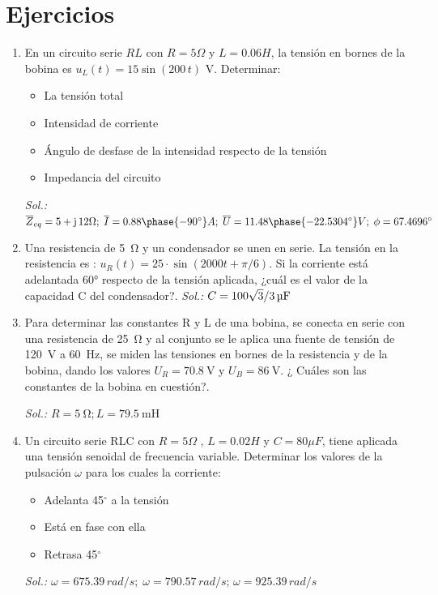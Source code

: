 \section*{Ejercicios}
	
\begin{enumerate}
		
\item En un circuito serie $RL$ con $R=5\Omega$ y $L=0.06H$, la
  tensión en bornes de la bobina es $u_L(t)=15\sin(200\,t)$
  V. Determinar:
  \begin{itemize}
  \item La tensión total
  \item Intensidad de corriente
  \item Ángulo de desfase de la intensidad respecto de la tensión
  \item Impedancia del circuito
  \end{itemize}
  \emph{Sol.:
    $\overline{Z}_{eq}=5+\mathrm{j}\,12\Omega;\;\overline{I}=0.88\phase{-90^\circ}A;\;\overline{U}=11.48\phase{-22.5304^\circ}
    V;\; \phi=67.4696^\circ$}

\item Una resistencia de \qty{5}{\ohm} y un condensador se unen en
  serie. La tensión en la resistencia es :
  $u_R(t) = 25 \cdot \sin(2000t + \pi/6)$. Si la corriente está
  adelantada \ang{60} respecto de la tensión aplicada, ¿cuál es el
  valor de la capacidad C del condensador?.  \emph{Sol.:
    $C = \SI[parse-numbers = false]{100\sqrt{3}/3}{\micro\farad}$}
  

\item Para determinar las constantes R y L de una bobina, se conecta
  en serie con una resistencia de \qty{25}{\ohm} y al conjunto se le
  aplica una fuente de tensión de \qty{120}{\volt} a \qty{60}{\hertz},
  se miden las tensiones en bornes de la resistencia y de la bobina,
  dando los valores $U_R = \qty{70.8}{\volt}$ y
  $U_B = \qty{86}{\volt}$. ¿ Cuáles son las constantes de la bobina en
  cuestión?.

  \emph{Sol.: $R = \qty{5}{\ohm}; L = \qty{79.5}{\milli\henry}$}

\item Un circuito serie RLC con $R = {5}{\Omega}$ , $L = {0.02}{H}$ y
  $C={80}{\mu F}$, tiene aplicada una tensión senoidal de frecuencia
  variable. Determinar los valores de la pulsación $\omega$ para los
  cuales la corriente:
  \begin{itemize}
  \item Adelanta {45}{$^\circ$} a la tensión
  \item Está en fase con ella
  \item Retrasa {45}{$^\circ$}
  \end{itemize}
  \emph{Sol.:
    $\omega=675.39\,rad/s;\; \omega=790.57\,rad/s;\,
    \omega=925.39\,rad/s$}


\end{enumerate}
